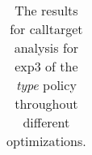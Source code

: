\begin{table}[!htbp]
{\begin{tabular}{l|c|c|c}
    	\end{tabular}
%
%
%	
%
%
%
%	
%	
%	
%
%
%
}
		\caption {The results for calltarget analysis for exp3 of the \textit{type} policy throughout different optimizations.}
		\label{tbl:CTdestinterexp34TYPE}
\end{table}



